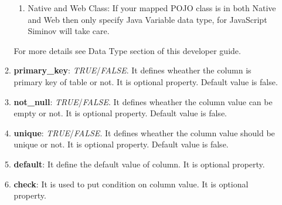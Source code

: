 \begin{enumerate}
\begin{enumerate}
\begin{center}
{{\begin{enumerate}
\begin{enumerate}
						\item \small Object								

						\item \small Null								

						\item \small Undefined								
	
					\end{enumerate}


					\item \small Native and Web Class: If your mapped POJO class is in both Native and Web then only specify Java Variable data type, for JavaScript Siminov will take care.


				\end{enumerate}

				\vspace*{0.0cm} %
			}
		}

	\end{center}

				

				\par
				For more details see Data Type section of this developer guide.
			
			\item \small \textbf{primary\_key}: \textit{TRUE}/\textit{FALSE}. It defines wheather the column is primary key of table or not. It is optional property. Default value is false.
			\item \small \textbf{not\_null}: \textit{TRUE}/\textit{FALSE}. It defines wheather the column value can be empty or not. It is optional property. Default value is false.
			\item \small \textbf{unique}: \textit{TRUE}/\textit{FALSE}. It defines wheather the column value should be unique or not. It is optional property. Default value is false.
			\item \small \textbf{default}: It define the default value of column. It is optional property.
			\item \small \textbf{check}: It is used to put condition on column value. It is optional property.

		\end{enumerate}

			\begin{center}
				\colorbox{grey}{
					\parbox[t]{.8\linewidth}{
						\fontsize{11pt}{11pt}\selectfont %
						\vspace*{0.1cm} %
		
}}
\end{center}
\end{enumerate}

